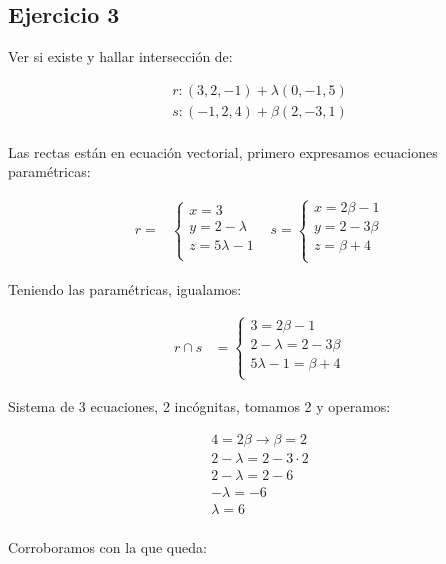 \documentclass{article}
\begin{document}
\subsection*{Ejercicio 3}

Ver si existe y hallar intersección de:

\begin{align*}
    r: (3, 2, -1) + \lambda (0,-1,5) \\
    s: (-1, 2, 4) + \beta (2,-3,1)   \\
\end{align*}

Las rectas están en ecuación vectorial,
primero expresamos ecuaciones paramétricas:

\begin{align*}
    r =                  &
    \begin{cases}
        x = 3             \\
        y = 2 - \lambda   \\
        z = 5 \lambda - 1 \\
    \end{cases} &
    s =
    \begin{cases}
        x = 2 \beta - 1 \\
        y = 2 - 3 \beta \\
        z = \beta + 4   \\
    \end{cases}
\end{align*}

Teniendo las paramétricas, igualamos:

\begin{align*}
    r \cap s & =
    \begin{cases}
        3 = 2 \beta - 1           \\
        2 - \lambda = 2 - 3 \beta \\
        5 \lambda - 1 = \beta + 4 \\
    \end{cases}
\end{align*}

Sistema de 3 ecuaciones, 2 incógnitas, tomamos 2 y operamos:

\begin{align*}
    4 = 2 \beta \rightarrow \beta = 2 \\
    2 - \lambda = 2 - 3 \cdot 2       \\
    2 - \lambda = 2 - 6               \\
    -\lambda = -6                     \\
    \boxed{\lambda = 6}              \\
\end{align*}

Corroboramos con la que queda:
\end{document}

